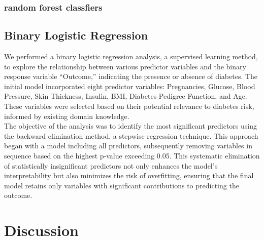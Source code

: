 \documentclass[12pt]{article}
\begin{document}
 \subsubsection{random forest classfiers}

\subsection{Binary Logistic Regression}
We performed a binary logistic regression analysis, a supervised learning method, to explore the relationship between various predictor variables and the binary response variable “Outcome,” indicating the presence or absence of diabetes. The initial model incorporated eight predictor variables: Pregnancies, Glucose, Blood Pressure, Skin Thickness, Insulin, BMI, Diabetes Pedigree Function, and Age. These variables were selected based on their potential relevance to diabetes risk, informed by existing domain knowledge.\\
\setlength{\parindent}{0pt}
The objective of the analysis was to identify the most significant predictors using the backward elimination method, a stepwise regression technique. This approach began with a model including all predictors, subsequently removing variables in sequence based on the highest p-value exceeding 0.05. This systematic elimination of statistically insignificant predictors not only enhances the model’s interpretability but also minimizes the risk of overfitting, ensuring that the final model retains only variables with significant contributions to predicting the outcome.


\section{Discussion}
\end{document}
